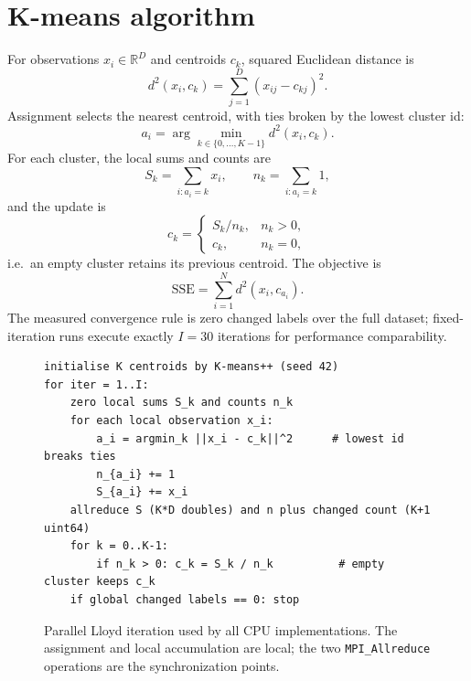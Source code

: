 \documentclass[10pt,a4paper]{article}
\newcommand{\code}[1]{\texttt{#1}}
\begin{document}
\section{K-means algorithm}
For observations $x_i\in\mathbb{R}^{D}$ and centroids $c_k$, squared Euclidean
distance is
\begin{equation}
d^2(x_i,c_k)=\sum_{j=1}^{D}(x_{ij}-c_{kj})^2 .
\end{equation}
Assignment selects the nearest centroid, with ties broken by the lowest
cluster id:
\begin{equation}
a_i=\arg\min_{k\in\{0,\ldots,K-1\}} d^2(x_i,c_k).
\end{equation}
For each cluster, the local sums and counts are
\begin{equation}
S_k=\sum_{i:a_i=k}x_i,\qquad n_k=\sum_{i:a_i=k}1,
\end{equation}
and the update is
\begin{equation}
c_k=\begin{cases}S_k/n_k,&n_k>0,\\ c_k,&n_k=0,\end{cases}
\end{equation}
i.e.\ an empty cluster retains its previous centroid. The objective is
\begin{equation}
\mathrm{SSE}=\sum_{i=1}^{N}d^2(x_i,c_{a_i}).
\end{equation}
The measured convergence rule is zero changed labels over the full dataset;
fixed-iteration runs execute exactly $I=30$ iterations for performance
comparability.

\begin{figure}[H]
\centering
\begin{minipage}{0.93\textwidth}
\small
\begin{verbatim}
initialise K centroids by K-means++ (seed 42)
for iter = 1..I:
    zero local sums S_k and counts n_k
    for each local observation x_i:
        a_i = argmin_k ||x_i - c_k||^2      # lowest id breaks ties
        n_{a_i} += 1
        S_{a_i} += x_i
    allreduce S (K*D doubles) and n plus changed count (K+1 uint64)
    for k = 0..K-1:
        if n_k > 0: c_k = S_k / n_k          # empty cluster keeps c_k
    if global changed labels == 0: stop
\end{verbatim}
\end{minipage}
\caption{Parallel Lloyd iteration used by all CPU implementations. The
assignment and local accumulation are local; the two \code{MPI\_Allreduce}
operations are the synchronization points.}
\label{fig:pseudocode}
\end{figure}
\end{document}
